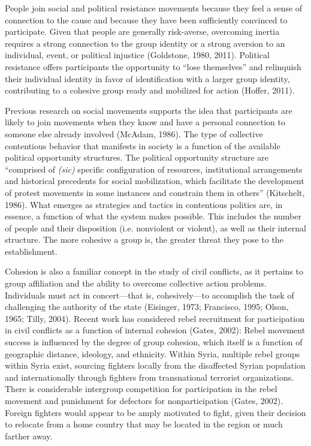 \documentclass[
  english,
  man]{apa6}
\begin{document}
People join social and political resistance movements because they feel a sense
of connection to the cause and because they have been sufficiently convinced to
participate. Given that people are generally risk-averse, overcoming inertia
requires a strong connection to the group identity or a strong aversion to an
individual, event, or political injustice (Goldstone, 1980, 2011). Political resistance offers participants the
opportunity to \enquote{lose themselves} and relinquish their individual identity in
favor of identification with a larger group identity, contributing to a cohesive
group ready and mobilized for action (Hoffer, 2011).

Previous research on social movements supports the idea that participants are
likely to join movements when they know and have a personal connection to
someone else already involved (McAdam, 1986). The type of collective
contentious behavior that manifests in society is a function of the available
political opportunity structures. The political opportunity structure are
\enquote{comprised of \emph{(sic)} specific configuration of resources, institutional
arrangements and historical precedents for social mobilization, which facilitate
the development of protest movements in some instances and constrain them in
others} (Kitschelt, 1986). What emerges as strategies and tactics in
contentious politics are, in essence, a function of what the system makes
possible. This includes the number of people and their disposition (i.e.
nonviolent or violent), as well as their internal structure. The more cohesive a
group is, the greater threat they pose to the establishment.

Cohesion is also a familiar concept in the study of civil conflicts, as it
pertains to group affiliation and the ability to overcome collective action
problems. Individuals must act in concert---that is, cohesively---to
accomplish the task of challenging the authority of the state (Eisinger, 1973; Francisco, 1995; Olson, 1965; Tilly, 2004).
Recent work has considered rebel recruitment for participation in
civil conflicts as a function of internal cohesion (Gates, 2002):
Rebel movement success is influenced by the degree of group cohesion, which
itself is a function of geographic distance, ideology, and ethnicity.
Within Syria, multiple rebel groups within Syria exist, sourcing fighters locally
from the disaffected Syrian population and internationally through
fighters from transnational terrorist organizations. There is considerable
intergroup competition for participation in the rebel movement and
punishment for defectors for nonparticipation (Gates, 2002).
Foreign fighters would appear to be amply motivated to fight, given their
decision to relocate from a home country that may be located in the region
or much farther away.
\end{document}
